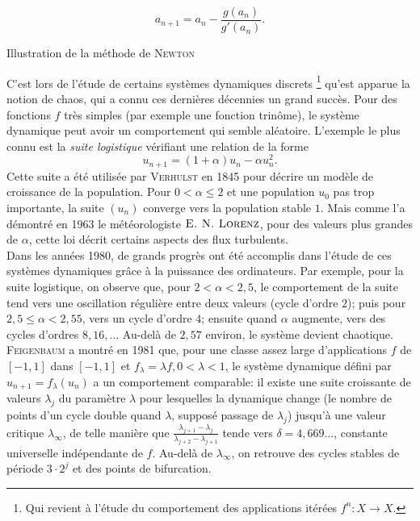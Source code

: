{$$a_{n+1} = a_n - \frac{g(a_n)}{g'(a_n)}.$$
\begin{marginfigure}[-5cm]
    \centering
    
    \caption*{\centering Illustration de la méthode de \textsc{Newton}}
\end{marginfigure}
C'est lors de l'étude de certains systèmes dynamiques discrets \footnote{Qui revient à l'étude du comportement des applications itérées $f^n : X \to X$.} qu'est apparue la notion de chaos, qui a connu ces dernières décennies un grand succès. Pour des fonctions $f$ très simples (par exemple une fonction trinôme), le système dynamique peut avoir un comportement qui semble aléatoire. L'exemple le plus connu est la \emph{suite logistique} vérifiant une relation de la forme
$$u_{n+1} = (1 + \alpha) u_n - \alpha u_n^2.$$
Cette suite a été utilisée par \textsc{Verhulst} en 1845 pour décrire un modèle de croissance de la population. Pour $0 < \alpha \leqslant 2$ et une population $u_0$ pas trop importante, la suite $(u_n)$ converge vers la population stable $1$. Mais comme l'a démontré en 1963 le météorologiste $\textsc{E. N. Lorenz}$, pour des valeurs plus grandes de $\alpha$, cette loi décrit certains aspects des flux turbulents. \\
Dans les années 1980, de grands progrès ont été accomplis dans l'étude de ces systèmes dynamiques grâce à la puissance des ordinateurs. Par exemple, pour la suite logistique, on observe que, pour $2 < \alpha < 2,5$, le comportement de la suite tend vers une oscillation régulière entre deux valeurs (cycle d'ordre $2$); puis pour $2,5 \leqslant \alpha < 2,55$, vers un cycle d'ordre $4$; ensuite quand $\alpha$ augmente, vers des cycles d'ordres $8, 16, \dots$ Au-delà de $2,57$ environ, le système devient chaotique. \textsc{Feigenbaum} a montré en 1981 que, pour une classe assez large d'applications $f$ de $[-1, 1]$ dans $[-1, 1]$ et $f_\lambda = \lambda f, 0 < \lambda < 1$, le système dynamique défini par $u_{n+1} = f_\lambda(u_n)$ a un comportement comparable: il existe une suite croissante de valeurs $\lambda_j$ du paramètre $\lambda$ pour lesquelles la dynamique change (le nombre de points d'un cycle double quand $\lambda$, supposé passage de $\lambda_j$) jusqu'à une valeur critique $\lambda_\infty$, de telle manière que $\frac{\lambda_{j+1} - \lambda_j}{\lambda_{j+2} - \lambda_{j+1}}$ tende vers $\delta = 4,669\dots$, constante universelle indépendante de $f$. Au-delà de $\lambda_\infty$, on retrouve des cycles stables de période $3 \cdot 2^j$ et des points de bifurcation. \\
}
